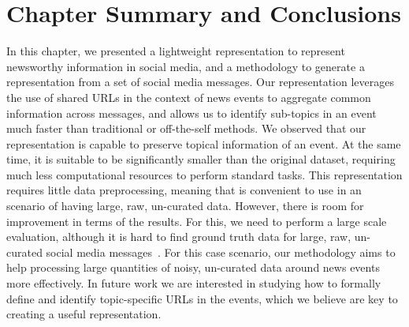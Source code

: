 \section{Chapter Summary and Conclusions}\label{sec:conclusions}





In this chapter, we presented a lightweight representation to represent newsworthy
information in social media, and a methodology to generate a representation from
a set of social media messages. 
%
Our representation leverages the use of shared URLs in the context of news
events to aggregate common information across messages, and allows us to
identify sub-topics in an event much faster than traditional or off-the-self
methods.
%
We observed that our representation is capable to preserve topical information
of an event.
%
At the same time, it is suitable to be significantly smaller than the original
dataset, requiring much less computational resources to perform standard tasks.
%
This representation requires little data preprocessing, meaning that is
convenient to use in an scenario of having large, raw, un-curated data.
%
However, there is room for improvement in terms of the results.
%
For this, we need to perform a large scale evaluation, although it is hard to
find ground truth data for large, raw, un-curated social media
messages~\cite{Alonso:2015:WCW:2740908.2745397}.
%
For this case scenario, our methodology aims to help processing large quantities
of noisy, un-curated data around news events more effectively.
%
In future work we are interested in studying how to formally define and identify
topic-specific URLs in the events, which we believe are key to creating a useful
representation.
%
%